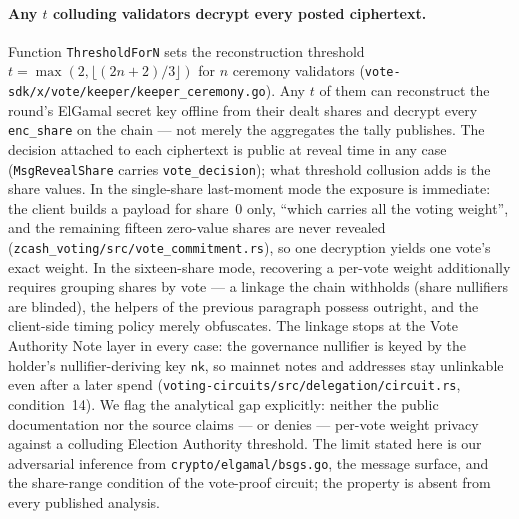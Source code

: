 \documentclass[11pt,a4paper]{article}
\theoremstyle{definition}
\newcommand{\nksym}{\ensuremath{\mathsf{nk}}}
\begin{document}
\paragraph{Any $t$ colluding validators decrypt every posted ciphertext.}
Function \texttt{ThresholdForN} sets the reconstruction threshold
$t = \max(2, \lfloor (2n+2)/3 \rfloor)$ for $n$ ceremony validators
(\texttt{vote-sdk/x/vote/keeper/keeper\_ceremony.go}). Any $t$ of them can
reconstruct the round's ElGamal secret key offline from their dealt shares
and decrypt every \texttt{enc\_share} on the chain --- not merely the
aggregates the tally publishes. The decision attached to each ciphertext
is public at reveal time in any case (\texttt{MsgRevealShare} carries
\texttt{vote\_decision}); what threshold collusion adds is the share
values. In the single-share last-moment mode the exposure is immediate:
the client builds a payload for share~0 only, ``which carries all the
voting weight'', and the remaining fifteen zero-value shares are never
revealed (\texttt{zcash\_voting/src/vote\_commitment.rs}), so one
decryption yields one vote's exact weight. In the sixteen-share mode,
recovering a per-vote weight additionally requires grouping shares by
vote --- a linkage the chain withholds (share nullifiers are blinded), the
helpers of the previous paragraph possess outright, and the client-side
timing policy merely obfuscates. The linkage stops at the Vote Authority
Note layer in every case: the governance nullifier is keyed by the
holder's nullifier-deriving key \nksym{}, so mainnet notes and addresses
stay unlinkable even after a later spend
(\texttt{voting-circuits/src/delegation/circuit.rs}, condition~14). We
flag the analytical gap explicitly: neither the public documentation nor
the source claims --- or denies --- per-vote weight privacy against a
colluding Election Authority threshold. The limit stated here is our
adversarial inference from \texttt{crypto/elgamal/bsgs.go}, the message
surface, and the share-range condition of the vote-proof circuit; the
property is absent from every published analysis.
\end{document}
